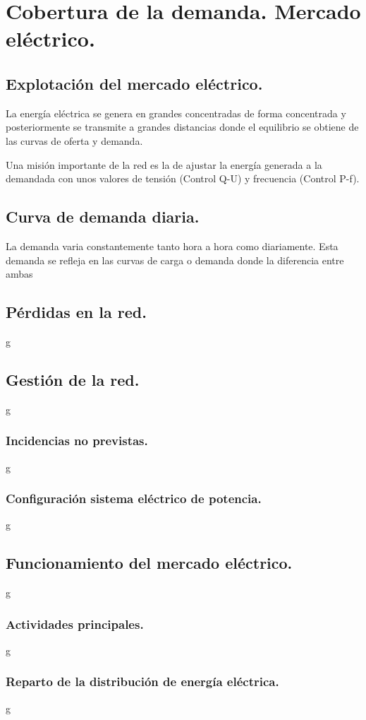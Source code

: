 \chapter{Cobertura de la demanda. Mercado eléctrico.}
\section{Explotación del mercado eléctrico.}
La energía eléctrica se genera en grandes concentradas de forma concentrada y posteriormente se transmite a grandes distancias donde el equilibrio se obtiene de las curvas de oferta y demanda.


Una misión importante de la red es la de ajustar la energía generada a la demandada con unos valores de tensión (Control Q-U) y frecuencia (Control P-f).
\section{Curva de demanda diaria.}
La demanda varia constantemente tanto hora a hora como diariamente. Esta demanda se refleja en las curvas de carga o demanda donde la diferencia entre ambas 


\section{Pérdidas en la red.}
g
\section{Gestión de la red.}
g
\subsection{Incidencias no previstas.}
g
\subsection{Configuración sistema eléctrico de potencia.}
g
\section{Funcionamiento del mercado eléctrico.}
g
\subsection{Actividades principales.}
g
\subsection{Reparto de la distribución de energía eléctrica.}
g
